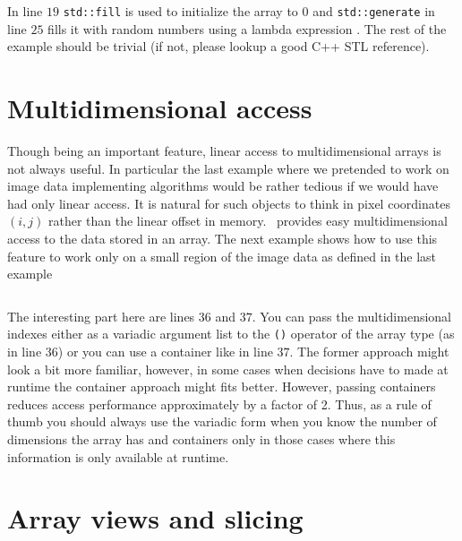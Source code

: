 \inputminted[fontsize=\small,
             linenos,
             firstline=24,
             frame=lines,
             label=examples/array\_stl.cpp]
{cpp}{../examples/array_stl.cpp}
In line $19$ {\tt std::fill} is used to initialize the array to $0$ and 
{\tt std::generate} in line $25$ fills it with random numbers using a lambda
expression . The rest of the example should be trivial (if not, please lookup a
good C++ STL reference).

\section{Multidimensional access}

Though being an important feature, linear access to multidimensional arrays is
not always useful. In particular the last example where we pretended to work on
image data implementing algorithms would be rather tedious if we would have had
only linear access. It is natural for such objects to think in pixel coordinates
$(i,j)$ rather than the linear offset in memory. 
\libpnicore\ provides easy multidimensional access to the data stored in an
array. The next example shows how to use this feature to work only on a small
region of the image data as defined in the last example
\inputminted[fontsize=\small,
             linenos,
             firstline=24,
             frame=lines,
             label=examples/array\_multiindex.cpp]
{cpp}{../examples/array_multiindex.cpp}
The interesting part here are lines $36$ and $37$. You can pass the
multidimensional indexes either as a variadic argument list to the  {\tt ()}
operator of the array type (as in line $36$) or you can use a container like 
in line $37$. The former approach might look a bit more familiar, however, in
some cases when decisions have to made at runtime the container approach might
fits better. However, passing containers reduces access performance
approximately by a factor of 2. Thus, as a rule of thumb you should always use
the variadic form when you know the number of dimensions the array has and
containers only in those cases where this information is only available at
runtime.

\section{Array views and slicing}

